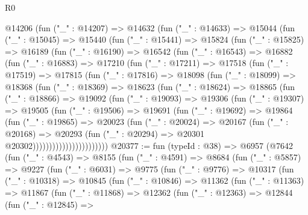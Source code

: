 \begin{lexlean}{R0}
\begin{coremodule}
  @14206
    (fun ("_" : @14207) =>
    @14632
      (fun ("_" : @14633) =>
      @15044
        (fun ("_" : @15045) =>
        @15440
          (fun ("_" : @15441) =>
          @15824
            (fun ("_" : @15825) =>
            @16189
              (fun ("_" : @16190) =>
              @16542
                (fun ("_" : @16543) =>
                @16882
                  (fun ("_" : @16883) =>
                  @17210
                    (fun ("_" : @17211) =>
                    @17518
                      (fun ("_" : @17519) =>
                      @17815
                        (fun ("_" : @17816) =>
                        @18098
                          (fun ("_" : @18099) =>
                          @18368
                            (fun ("_" : @18369) =>
                            @18623
                              (fun ("_" : @18624) =>
                              @18865
                                (fun ("_" : @18866) =>
                                @19092
                                  (fun ("_" : @19093) =>
                                  @19306
                                    (fun ("_" : @19307) =>
                                    @19505
                                      (fun ("_" : @19506) =>
                                      @19691
                                        (fun ("_" : @19692) =>
                                        @19864
                                          (fun ("_" : @19865) =>
                                          @20023
                                            (fun ("_" : @20024) =>
                                            @20167
                                              (fun ("_" : @20168) =>
                                              @20293
                                                (fun ("_" : @20294) =>
                                                @20301 @20302)))))))))))))))))))))))
@20377 := fun (typeId : @38) =>
  @6957
    (@7642
      (fun ("_" : @4543) =>
      @8155
        (fun ("_" : @4591) =>
        @8684
          (fun ("_" : @5857) =>
          @9227
            (fun ("_" : @6031) =>
            @9775
              (fun ("_" : @9776) =>
              @10317
                (fun ("_" : @10318) =>
                @10845
                  (fun ("_" : @10846) =>
                  @11362
                    (fun ("_" : @11363) =>
                    @11867
                      (fun ("_" : @11868) =>
                      @12362
                        (fun ("_" : @12363) =>
                        @12844
                          (fun ("_" : @12845) =>

\end{coremodule}
\end{lexlean}
